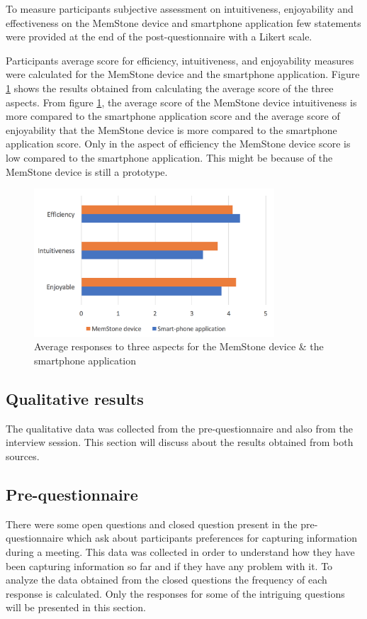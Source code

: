 \documentclass[mscthesis]{usiinfthesis}
\begin{document}
To measure participants subjective assessment on intuitiveness, enjoyability and effectiveness on the MemStone device and smartphone application few statements were provided at the end of the post-questionnaire with a Likert scale.

Participants average score for efficiency, intuitiveness, and enjoyability measures were calculated for the MemStone device and the smartphone application. Figure \ref{fig24} shows the results obtained from calculating the average score of the three aspects. From figure \ref{fig24}, the average score of the MemStone device intuitiveness is more compared to the smartphone application score and the average score of enjoyability that the MemStone device is more compared to the smartphone application score. Only in the aspect of efficiency the MemStone device score is low compared to the smartphone application. This might be because of the MemStone device is still a prototype. 
\begin{figure}[!ht]
  \centering
  \includegraphics[width=0.8\textwidth]{qa}
  \caption{Average responses to three aspects for the MemStone device \& the smartphone application}
  \label{fig24}
\end{figure}


\subsection{Qualitative results}
The qualitative data was collected from the pre-questionnaire and also from the interview session. This section will discuss about the results obtained from both sources. 
\subsection*{Pre-questionnaire}
There were some open questions and closed question present in the pre-questionnaire which ask about participants preferences for capturing information during a meeting. This data was collected in order to understand how they have been capturing information so far and if they have any problem with it. To analyze the data obtained from the closed questions the frequency of each response is calculated. Only the responses for some of the intriguing questions will be presented in this section.
\newline
\end{document}
